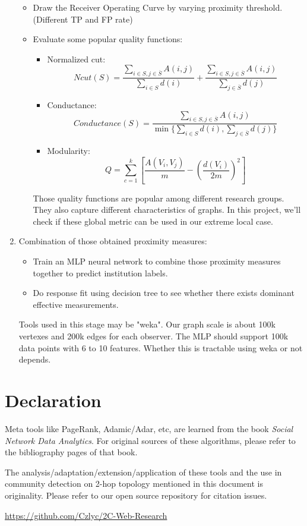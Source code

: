 \documentclass[11pt,a4paper]{article}
\begin{document}
\begin{enumerate}
\begin{itemize}
			\item Draw the Receiver Operating Curve by varying proximity threshold. 
			(Different TP and FP rate)
			\item Evaluate some popular quality functions:
				\begin{itemize}
					\item Normalized cut:
					\begin{equation}
						Ncut(S)=\frac{\sum_{i \in S, j \in \overline{S}}{A(i,j)}}
						{\sum_{i \in S}{d(i)}}
						+ \frac{\sum_{i \in S, j \in \overline{S}}{A(i,j)}}
						{\sum_{j \in \overline{S}}{d(j)}}						
					\end{equation}
					\item Conductance:
					\begin{equation}
						Conductance(S)=\frac{\sum_{i \in S, j \in \overline{S}}{A(i,j)}}
						{\min \{ \sum_{i \in S}{d(i)}, \sum_{j \in \overline{S}}{d(j)}\}}				
					\end{equation}
					\item Modularity:
					\begin{equation}
						Q=\sum_{c=1}^{k}{\left[ 
						\frac{A(V_i,V_j)}{m} 
						-\left( \frac{d(V_i)}{2m}\right)^2
						\right]}
					\end{equation}
				\end{itemize}
				Those quality functions are popular among different research 
				groups. They also capture different characteristics of graphs. 
				In this project, we'll check if these global metric can 
				be used in our extreme local case. 
		\end{itemize}
	\item Combination of those obtained proximity measures:
		\begin{itemize}
			\item Train an MLP neural network to combine those proximity measures
			together to predict institution labels. 
			\item Do response fit using decision tree to see whether there exists 
			dominant effective measurements. 
		\end{itemize}
		Tools used in this stage may be "weka". Our graph scale is about 100k vertexes
		and 200k edges for each observer. The MLP should support 100k data points with 
		6 to 10 features. Whether this is tractable using weka or not depends. 
\end{enumerate}

\section{Declaration}

Meta tools like PageRank, Adamic/Adar, etc, are learned from the book
\textit{Social Network Data Analytics}. For original sources of these 
algorithms, please refer to the bibliography pages of that book.

The analysis/adaptation/extension/application of these tools and 
the use in community detection on 2-hop topology mentioned 
in this document is originality. Please refer to our open source 
repository for citation issues.

\url{https://github.com/Czlyc/2C-Web-Research}
\end{document}
